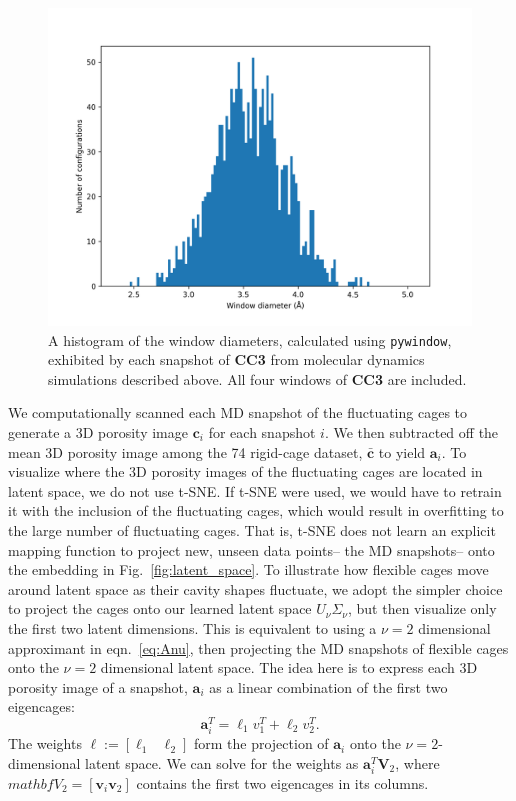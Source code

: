 \documentclass[journal=jacsat,manuscript=article]{achemso}
\begin{document}
{\begin{figure}
\centering
	\includegraphics[width=0.65\columnwidth]{../cc3_histogram.png}
	\caption{\color{red}A histogram of the window diameters, calculated using \texttt{pywindow}, exhibited by each snapshot of \textbf{CC3} from molecular dynamics simulations described above. All four windows of \textbf{CC3} are included.
	} \label{fig:window_diameter_hist}
\end{figure}

We computationally scanned each MD snapshot of the fluctuating cages to generate a 3D porosity image $\mathbf{c}_i$ for each snapshot $i$. We then subtracted off the mean 3D porosity image among the 74 rigid-cage dataset, $\bar{\mathbf{c}}$ to yield $\mathbf{a}_i$.
To visualize where the 3D porosity images of the fluctuating cages are located in latent space, we do not use t-SNE. If t-SNE were used, we would have to retrain it with the inclusion of the fluctuating cages, which would result in overfitting to the large number of fluctuating cages. That is, t-SNE does not learn an explicit mapping function to project new, unseen data points-- the MD snapshots-- onto the embedding in Fig.~\ref{fig:latent_space}. To illustrate how flexible cages move around latent space as their cavity shapes fluctuate, we adopt the simpler choice to project the cages onto our learned latent space $U_\nu \Sigma_\nu$, but then visualize only the first two latent dimensions. This is equivalent to using a $\nu=2$ dimensional approximant in eqn.~\ref{eq:Anu}, then projecting the MD snapshots of flexible cages onto the $\nu=2$ dimensional latent space. 
The idea here is to express each 3D porosity image of a snapshot, $\mathbf{a}_i$ as a linear combination of the first two eigencages:
\begin{equation}
\mathbf{a}_i^T = \ell_1 v_1^T + \ell_2 v_2^T.
\end{equation} The weights $\mathbf{\ell}:=[\ell_1 \text{ } \ell_2]$ form the projection of $\mathbf{a}_i$ onto the $\nu=2$-dimensional latent space. We can solve for the weights as $\mathbf{a}_i^T \mathbf{V}_2$, where $mathbf{V}_2 = [\mathbf{v}_i \mathbf{v}_2]$ contains the first two eigencages in its columns.

}
\end{document}

